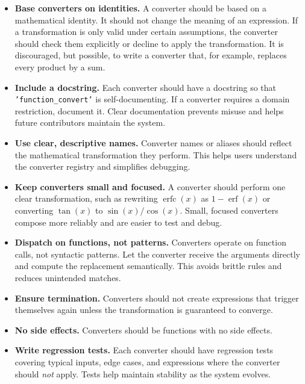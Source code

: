 \documentclass[12pt,fleqn]{extarticle}
\newcommand{\ttq}[1]{\texttt{'#1'}}
\newcommand{\funconvert}{\ttq{function\_convert}{ }}
\DeclareMathOperator{\erf}{erf}
\DeclareMathOperator{\erfc}{erfc}
\begin{document}
\begin{itemize}

  \item \textbf{Base converters on identities.}
        A converter should be based on a mathematical identity.
        It should not change the meaning of an expression. If a transformation is only valid under certain
        assumptions, the converter should check them explicitly or decline
        to apply the transformation. It is discouraged, but possible, to
        write a converter that, for example, replaces every product by a sum.

  \item \textbf{Include a docstring.}
        Each converter should have a docstring so that \funconvert is
        self-documenting. If a converter requires a domain restriction, document it. 
        Clear documentation prevents
        misuse and helps future contributors maintain the system.

  \item \textbf{Use clear, descriptive names.}
        Converter names or aliases should reflect the mathematical
        transformation they perform. This helps users understand the
        converter registry and simplifies debugging.

  \item \textbf{Keep converters small and focused.}
        A converter should perform one clear transformation, such as
        rewriting \(\erfc(x)\) as \(1 - \erf(x)\) or converting
        \(\tan(x)\) to \(\sin(x)/\cos(x)\). Small, focused converters
        compose more reliably and are easier to test and debug.

  \item \textbf{Dispatch on functions, not patterns.}
        Converters operate on function calls, not syntactic patterns. Let
        the converter receive the arguments directly and compute the
        replacement semantically. This avoids brittle rules and reduces
        unintended matches.

  \item \textbf{Ensure termination.}
        Converters should not create expressions that trigger themselves
        again unless the transformation is guaranteed to converge.
        
\item \textbf{No side effects.} Converters should be functions with no side effects.

  \item \textbf{Write regression tests.}
        Each converter should have regression tests covering typical
        inputs, edge cases, and expressions where the converter should
        \emph{not} apply. Tests help maintain stability as the system
        evolves.

\end{itemize}
\end{document}
